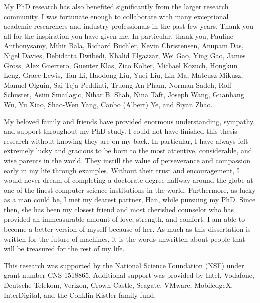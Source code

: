 \begin{acknowledgments}
    My PhD research has also benefited significantly from the larger research
    community. I was fortunate enough to collaborate with many exceptional
    academic researchers and industry professionals in the past few years. Thank
    you all for the inspiration you have given me. In particular, thank you,
    Pauline Anthonysamy, Mihir Bala, Richard Buchler, Kevin Christensen, Anupam
    Das, Nigel Davies, Debidatta Dwibedi, Khalid Elgazzar, Wei Gao, Ying Gao,
    James Gross, Alex Guerrero, Guenter Klas, Zico Kolter, Michael Kozuch,
    Hongkun Leng, Grace Lewis, Tan Li, Haodong Liu, Yuqi Liu, Lin Ma, Mateusz
    Mikusz, Manuel Olguín, Sai Teja Peddinti, Truong An Pham, Norman Sadeh, Rolf
    Schuster, Asim Smailagic, Nihar B. Shah, Nina Taft, Joseph Wang, Guanhang
    Wu, Yu Xiao, Shao-Wen Yang, Canbo (Albert) Ye, and Siyan Zhao.

    My beloved family and friends have provided enormous understanding,
    sympathy, and support throughout my PhD study. I could not have finished
    this thesis research without knowing they are on my back. In particular, I
    have always felt extremely lucky and gracious to be born to the most
    attentive, considerable, and wise parents in the world. They instill the
    value of perseverance and compassion early in my life through examples.
    Without their trust and encouragement, I would never dream of completing a
    doctorate degree halfway around the globe at one of the finest computer
    science institutions in the world. Furthermore, as lucky as a man could be,
    I met my dearest partner, Han, while pursuing my PhD. Since then, she has
    been my closest friend and most cherished counselor who has provided an
    immeasurable amount of love, strength, and comfort. I am able to become a
    better version of myself because of her. As much as this dissertation is
    written for the future of machines, it is the words unwritten about people
    that will be treasured for the rest of my life.

    \vfill

    This research was supported by the National Science Foundation (NSF) under
    grant number CNS-1518865. Additional support was provided by Intel,
    Vodafone, Deutsche Telekom, Verizon, Crown Castle, Seagate, VMware,
    MobiledgeX, InterDigital, and the Conklin Kistler family fund.

    \clearpage

\end{acknowledgments}


